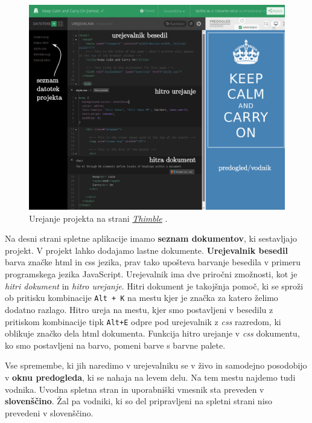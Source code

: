 \begin{figure}[h!]
  \centering
    \includegraphics [width=1\linewidth, keepaspectratio =
   1] {./images/sc_web/thimble_saup-v02.jpg}
   \caption{Urejanje projekta na strani
     \emph{\href{https://thimble.mozilla.org/sl/}{Thimble}}
     \cite{web:thimble}.}
   \label{fig:web:thimble:webapp}
 \end{figure}

 Na desni strani spletne aplikacije imamo \textbf{seznam dokumentov},
 ki sestavljajo projekt. V projekt lahko dodajamo lastne dokumente.
 \textbf{Urejevalnik besedil} barva značke html in css jezika, prav
 tako upošteva barvanje besedila v primeru programskega jezika
 JavaScript. Urejevalnik ima dve priročni zmožnosti, kot je
 \emph{hitri dokument} in \emph{hitro urejanje}. Hitri dokument je
 takojšnja pomoč, ki se sproži ob pritisku kombinacije \texttt{Alt +
   K} na mestu kjer je značka za katero želimo dodatno razlago. Hitro
 ureja na mestu, kjer smo postavljeni v besedilu z pritiskom
 kombinacije tipk \texttt{Alt+E} odpre pod urejevalnik z \emph{css}
 razredom, ki oblikuje značko dela html dokumenta. Funkcija hitro
 urejanje v \emph{css} dokumentu, ko smo postavljeni na barvo, pomeni
 barve s barvne palete.

 Vse spremembe, ki jih naredimo v urejevalniku se v živo in samodejno
 posodobijo v \textbf{oknu predogleda}, ki se nahaja na levem delu. Na
 tem mestu najdemo tudi vodnika.  Uvodna spletna stran in uporabniški
 vmesnik sta preveden v \textbf{slovenščino}. Žal pa vodniki, ki so
 del pripravljeni na spletni strani niso prevedeni v slovenščino.

